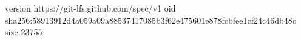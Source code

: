 version https://git-lfs.github.com/spec/v1
oid sha256:58913912d4a059a09a88537417085b3f62e475601e878fcbfee1cf24c46db48c
size 23755
